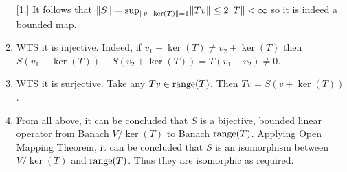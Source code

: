 \documentclass[a4paper, 10pt]{article}
\begin{document}
\begin{solution}
\begin{enumerate} [1.]
    It follows that $\lVert S\rVert = \sup_{\lVert v + \ker(T)\rVert = 1} \lVert Tv\rVert \leq 2 \lVert T\rVert < \infty$ so it is indeed a bounded map.

   \item WTS it is injective. Indeed, if $v_1 + \ker(T) \neq v_2 + \ker(T)$ then $S(v_1 + \ker(T)) - S(v_2 + \ker(T)) = T(v_1 - v_2) \neq 0$.
   \item WTS it is surjective. Take any $Tv \in \operatorname*{range}(T)$. Then $Tv = S(v + \ker(T))$.
   \item From all above, it can be concluded that $S$ is a bijective, bounded linear operator from Banach $V/\ker(T)$ to Banach $\operatorname*{range}(T)$. Applying Open Mapping Theorem, it can be concluded that $S$ is an isomorphism between $V/\ker(T)$ and $\operatorname*{range}(T)$. Thus they are isomorphic as required.
\end{enumerate}
\end{solution}
\end{document}
